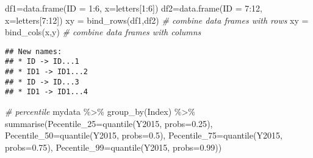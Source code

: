 \documentclass[
]{article}
\newenvironment{Shaded}{\begin{snugshade}}{\end{snugshade}}
\newcommand{\AttributeTok}[1]{\textcolor[rgb]{0.77,0.63,0.00}{#1}}
\newcommand{\CommentTok}[1]{\textcolor[rgb]{0.56,0.35,0.01}{\textit{#1}}}
\newcommand{\DecValTok}[1]{\textcolor[rgb]{0.00,0.00,0.81}{#1}}
\newcommand{\FloatTok}[1]{\textcolor[rgb]{0.00,0.00,0.81}{#1}}
\newcommand{\FunctionTok}[1]{\textcolor[rgb]{0.00,0.00,0.00}{#1}}
\newcommand{\NormalTok}[1]{#1}
\newcommand{\OtherTok}[1]{\textcolor[rgb]{0.56,0.35,0.01}{#1}}
\newcommand{\SpecialCharTok}[1]{\textcolor[rgb]{0.00,0.00,0.00}{#1}}
\begin{document}
\begin{Shaded}
\begin{Highlighting}[]
\NormalTok{df1}\OtherTok{=}\FunctionTok{data.frame}\NormalTok{(}\AttributeTok{ID =} \DecValTok{1}\SpecialCharTok{:}\DecValTok{6}\NormalTok{,  }\AttributeTok{x=}\NormalTok{letters[}\DecValTok{1}\SpecialCharTok{:}\DecValTok{6}\NormalTok{])}
\NormalTok{df2}\OtherTok{=}\FunctionTok{data.frame}\NormalTok{(}\AttributeTok{ID =} \DecValTok{7}\SpecialCharTok{:}\DecValTok{12}\NormalTok{, }\AttributeTok{x=}\NormalTok{letters[}\DecValTok{7}\SpecialCharTok{:}\DecValTok{12}\NormalTok{])}
\NormalTok{xy }\OtherTok{=} \FunctionTok{bind\_rows}\NormalTok{(df1,df2) }\CommentTok{\# combine data frames with rows}
\NormalTok{xy }\OtherTok{=} \FunctionTok{bind\_cols}\NormalTok{(x,y) }\CommentTok{\# combine data frames with columns}
\end{Highlighting}
\end{Shaded}

\begin{verbatim}
## New names:
## * ID -> ID...1
## * ID1 -> ID1...2
## * ID -> ID...3
## * ID1 -> ID1...4
\end{verbatim}

\begin{Shaded}
\begin{Highlighting}[]
\CommentTok{\# percentile}
\NormalTok{mydata }\SpecialCharTok{\%\textgreater{}\%} \FunctionTok{group\_by}\NormalTok{(Index) }\SpecialCharTok{\%\textgreater{}\%}
\FunctionTok{summarise}\NormalTok{(}\AttributeTok{Pecentile\_25=}\FunctionTok{quantile}\NormalTok{(Y2015, }\AttributeTok{probs=}\FloatTok{0.25}\NormalTok{),}
\AttributeTok{Pecentile\_50=}\FunctionTok{quantile}\NormalTok{(Y2015, }\AttributeTok{probs=}\FloatTok{0.5}\NormalTok{),}
\AttributeTok{Pecentile\_75=}\FunctionTok{quantile}\NormalTok{(Y2015, }\AttributeTok{probs=}\FloatTok{0.75}\NormalTok{),}
\AttributeTok{Pecentile\_99=}\FunctionTok{quantile}\NormalTok{(Y2015, }\AttributeTok{probs=}\FloatTok{0.99}\NormalTok{))}
\end{Highlighting}
\end{Shaded}
\end{document}
